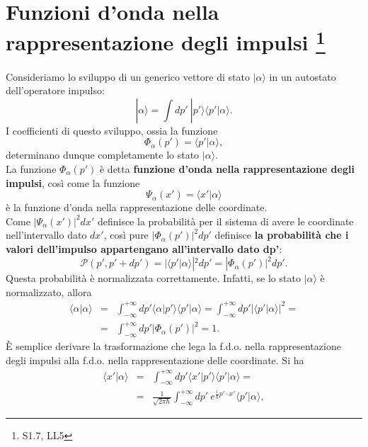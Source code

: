 \documentclass[a4paper,12pt,oneside]{book}
\begin{document}
\section[Funzioni d'onda nella rappresentazione degli impulsi]{Funzioni d'onda nella rappresentazione degli impulsi \footnote{S1.7, LL5}}
Consideriamo lo sviluppo di un generico vettore di stato $| \alpha \rangle$ in un autostato dell'operatore impulso:
\begin{equation}
| \alpha \rangle = \int dp' ~ | p' \rangle \langle p' | \alpha \rangle.
\end{equation}
I coefficienti di questo sviluppo, ossia la funzione
\begin{equation}
\Phi_\alpha (p') =  \langle p' | \alpha \rangle,
\end{equation}
determinano dunque completamente lo stato $| \alpha \rangle$.\\
La funzione $\Phi_\alpha (p')$ è detta \textbf{funzione d'onda nella rappresentazione degli impulsi}, così come la funzione
\begin{equation}
\Psi_\alpha (x') =  \langle x' | \alpha \rangle
\end{equation}
è la funzione d'onda nella rappresentazione delle coordinate.\\
Come $|\Psi_\alpha (x')|^2 dx'$ definisce la probabilità per il sistema di avere le coordinate nell'intervallo dato $dx'$, così pure $|\Phi_\alpha (p')|^2 dp'$ definisce \textbf{la probabilità che i valori dell'impulso appartengano all'intervallo dato dp'}:
\begin{equation}
\mathcal{P}(p', p'+dp') = |\langle p' | \alpha \rangle|^2 dp' = |\Phi_\alpha (p')|^2 dp'.
\end{equation}
Questa probabilità è normalizzata correttamente. Infatti, se lo stato $| \alpha \rangle$ è normalizzato, allora
\begin{eqnarray}
\langle \alpha | \alpha \rangle &=& \int_{-\infty}^{+\infty} dp' \langle \alpha | p' \rangle \langle p' | \alpha \rangle = \int_{-\infty}^{+\infty} dp' | \langle p' | \alpha \rangle |^2 = \nonumber \\
&=& \int_{-\infty}^{+\infty} dp' |\Phi_\alpha (p')|^2 = 1 .
\end{eqnarray}
\`E semplice derivare la trasformazione che lega la f.d.o. nella rappresentazione degli impulsi alla f.d.o. nella rappresentazione delle coordinate. Si ha
\begin{eqnarray}
\langle x' | \alpha \rangle &=& \int_{-\infty}^{+\infty} dp' \langle x' | p' \rangle \langle p' | \alpha \rangle =  \nonumber \\
&=& \frac{1}{\sqrt{2 \pi \hbar}} \int_{-\infty}^{+\infty} dp' ~ e^{\frac{i}{\hbar}p' \cdot x'} \langle p' | \alpha \rangle ,
\end{eqnarray}
\end{document}

